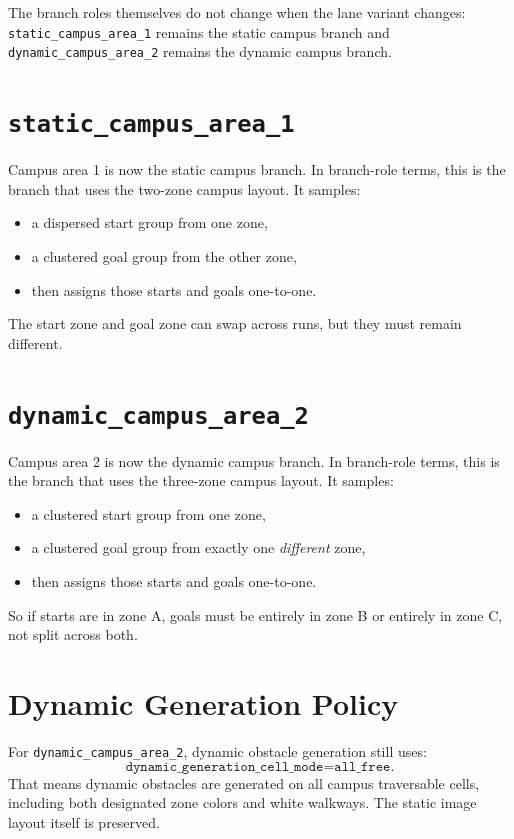 \documentclass[11pt]{article}
\begin{document}
The branch roles themselves do not change when the lane variant changes: \texttt{static\_campus\_area\_1} remains the static campus branch and \texttt{dynamic\_campus\_area\_2} remains the dynamic campus branch.

\section{\texttt{static\_campus\_area\_1}}

Campus area 1 is now the static campus branch. In branch-role terms, this is the branch that uses the two-zone campus layout. It samples:
\begin{itemize}[leftmargin=2em]
    \item a dispersed start group from one zone,
    \item a clustered goal group from the other zone,
    \item then assigns those starts and goals one-to-one.
\end{itemize}

The start zone and goal zone can swap across runs, but they must remain different.

\section{\texttt{dynamic\_campus\_area\_2}}

Campus area 2 is now the dynamic campus branch. In branch-role terms, this is the branch that uses the three-zone campus layout. It samples:
\begin{itemize}[leftmargin=2em]
    \item a clustered start group from one zone,
    \item a clustered goal group from exactly one \emph{different} zone,
    \item then assigns those starts and goals one-to-one.
\end{itemize}

So if starts are in zone A, goals must be entirely in zone B or entirely in zone C, not split across both.

\section{Dynamic Generation Policy}

For \texttt{dynamic\_campus\_area\_2}, dynamic obstacle generation still uses:
\[
\texttt{dynamic\_generation\_cell\_mode=all\_free}.
\]
That means dynamic obstacles are generated on all campus traversable cells, including both designated zone colors and white walkways. The static image layout itself is preserved.
\end{document}
